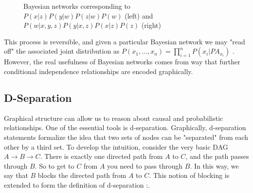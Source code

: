 \documentclass[12pt,twoside]{reedthesis}
\theoremstyle{definition}
\begin{document}
\begin{figure}
\centering
{}
\caption{Bayesian networks corresponding to $P(x | z)P(y | w)P(z | w)P(w)$ (left) and $P(w | x, y, z) P(y | x, z) P(x | z)P(z)$ (right)} \label{fig:BayesNet1}
\end{figure}

This process is reversible, and given a particular Bayesian network we may "read off" the associated joint distribution as $P(x_1, ..., x_n) = \prod_{i = 1}^n P(x_i | PA_{x_i})$ \citep{Pearl_2009}. However, the real usefulness of Bayesian networks comes from way that further conditional independence relationships are encoded graphically.

\subsection{D-Separation}

Graphical structure can allow us to reason about causal and probabilistic relationships. One of the essential tools is d-separation. Graphically, d-separation statements formalize the idea that two sets of nodes can be "separated" from each other by a third set.  To develop the intuition, consider the very basic DAG $A \rightarrow B \rightarrow C$. There is exactly one directed path from $A$ to $C$, and the path passes through $B$. So to get to $C$ from $A$ you need to pass through $B$. In this way, we say that $B$ blocks the directed path from $A$ to $C$. This notion of blocking is extended to form the definition of d-separation \citep{Peters_2017}:.
\end{document}
